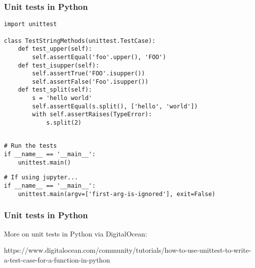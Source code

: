 \begin{frame}[fragile]
  \frametitle{Unit tests in Python}
  \begin{lstlisting}[style=Python]
import unittest

class TestStringMethods(unittest.TestCase):  
    def test_upper(self):
        self.assertEqual('foo'.upper(), 'FOO')
    def test_isupper(self):
        self.assertTrue('FOO'.isupper())
        self.assertFalse('Foo'.isupper())
    def test_split(self):
        s = 'hello world'
        self.assertEqual(s.split(), ['hello', 'world'])
        with self.assertRaises(TypeError):
            s.split(2)
            
  \end{lstlisting}\pause
  
  \begin{lstlisting}[style=Python]
# Run the tests
if __name__ == '__main__':
    unittest.main()
  \end{lstlisting}

\vspace{-1ex}

  \begin{lstlisting}[style=Python]
# If using jupyter...
if __name__ == '__main__':
    unittest.main(argv=['first-arg-is-ignored'], exit=False)
  \end{lstlisting}

\end{frame}

\begin{frame}[fragile]
  \frametitle{Unit tests in Python}
  More on unit tests in Python via DigitalOcean: 
  
  https://www.digitalocean.com/community/tutorials/how-to-use-unittest-to-write-a-test-case-for-a-function-in-python
\end{frame}


